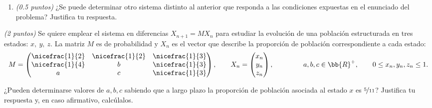 \documentclass[12pt]{article}
\begin{document}
\begin{ejercicio}
\begin{enumerate}
            \item \emph{(0.5 puntos)} ¿Se puede determinar otro sistema distinto al anterior que responda a las condiciones expuestas en el enunciado del problema? Justifica tu respuesta.
        \end{enumerate}
    \end{ejercicio}


    \begin{ejercicio} \emph{(2 puntos)}
        Se quiere emplear el sistema en diferencias $X_{n+1} = MX_n$ para estudiar la evolución de una población
        estructurada en tres estados: $x,~y,~z$. La matriz $M$ es de probabilidad y $X_n$ es el vector que describe la proporción
        de población correspondiente a cada estado:
        \begin{equation*}
            M = \begin{pmatrix}
                \nicefrac{1}{2} & \nicefrac{1}{2} & \nicefrac{1}{3}\\
                \nicefrac{1}{4} & b & \nicefrac{1}{3}\\
                a & c & \nicefrac{1}{3}\\
            \end{pmatrix},\hspace{0.7cm}
            X_n = \begin{pmatrix}
                x_n \\ y_n \\ z_n
            \end{pmatrix},
            \hspace{1.5cm}
            a,b,c\in \bb{R}^+,\qquad 0\leq x_n,y_n,z_n\leq 1.
        \end{equation*}

        ¿Pueden determinarse valores de $a,b,c$ sabiendo que a largo plazo la proporción de población asociada
        al estado $x$ es $\nicefrac{5}{11}$?
        Justifica tu respuesta y, en caso afirmativo, calcúlalos.
    \end{ejercicio}
\end{document}

